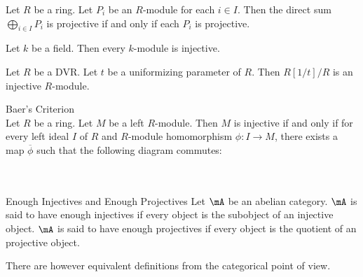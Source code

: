\documentclass[a4paper]{article}
\begin{document}
\begin{prp}{}{} Let $R$ be a ring. Let $P_i$ be an $R$-module for each $i\in I$. Then the direct sum $\bigoplus_{i\in I}P_i$ is projective if and only if each $P_i$ is projective. 
\end{prp}

\begin{eg}{}{} Let $k$ be a field. Then every $k$-module is injective. 
\end{eg}

\begin{eg}{}{} Let $R$ be a DVR. Let $t$ be a uniformizing parameter of $R$. Then $R[1/t]/R$ is an injective $R$-module. 
\end{eg}

\begin{prp}{Baer's Criterion}{}\\
Let $R$ be a ring. Let $M$ be a left $R$-module. Then $M$ is injective if and only if for every left ideal $I$ of $R$ and $R$-module homomorphism $\phi:I\to M$, there exists a map $\overline{\phi}$ such that the following diagram commutes: \\~\\
 \\
\end{prp}

\begin{defn}{Enough Injectives and Enough Projectives}{} Let $\mA$ be an abelian category. $\mA$ is said to have enough injectives if every object is the subobject of an injective object. $\mA$ is said to have enough projectives if every object is the quotient of an projective object. 
\end{defn}

There are however equivalent definitions from the categorical point of view. 
\end{document}
